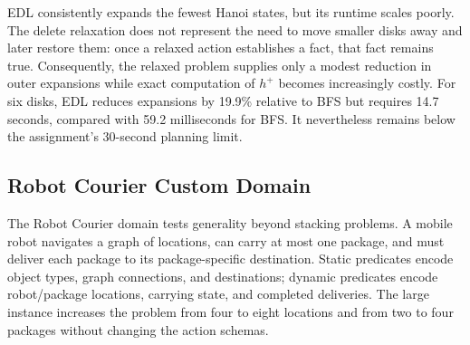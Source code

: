 EDL consistently expands the fewest Hanoi states, but its runtime scales poorly.
The delete relaxation does not represent the need to move smaller disks away and
later restore them: once a relaxed action establishes a fact, that fact remains
true.  Consequently, the relaxed problem supplies only a modest reduction in
outer expansions while exact computation of $h^+$ becomes increasingly costly.
For six disks, EDL reduces expansions by 19.9\% relative to BFS but requires
14.7 seconds, compared with 59.2 milliseconds for BFS.  It nevertheless remains
below the assignment's 30-second planning limit.

\subsection{Robot Courier Custom Domain}

The Robot Courier domain tests generality beyond stacking problems.  A mobile
robot navigates a graph of locations, can carry at most one package, and must
deliver each package to its package-specific destination.  Static predicates
encode object types, graph connections, and destinations; dynamic predicates
encode robot/package locations, carrying state, and completed deliveries.  The
large instance increases the problem from four to eight locations and from two
to four packages without changing the action schemas.

\begin{table}[t]
    \centering
    \caption{Results on the custom Robot Courier domain.}
    \label{tab:courier-results}
\end{table}

